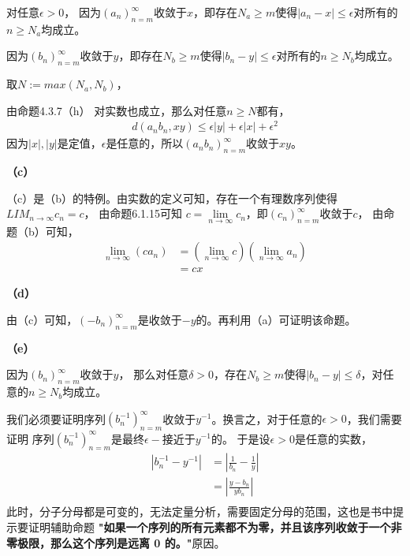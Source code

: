 \documentclass{article}
\theoremstyle{mystyle}
\begin{document}
对任意$\epsilon> 0$，
因为$(a_n)_{n=m}^\infty$收敛于$x$，即存在$N_a \geq m$使得$|a_n - x| \leq \epsilon$对所有的$n \geq N_a$均成立。

因为$(b_n)_{n=m}^\infty$收敛于$y$，即存在$N_b \geq m$使得$|b_n - y| \leq \epsilon$对所有的$n \geq N_b$均成立。

取$N := max(N_a, N_b)$，

由命题4.3.7（h） 对实数也成立，那么对任意$n \geq N$都有，
\begin{align*}
  d(a_nb_n,xy) \leq \epsilon|y| + \epsilon|x| + \epsilon^2
\end{align*}
因为$|x|, |y|$是定值，$\epsilon$是任意的，所以$(a_nb_n)_{n=m}^\infty$收敛于$xy$。

\textbf{（c）}

（c）是（b）的特例。由实数的定义可知，存在一个有理数序列使得$LIM_{n\rightarrow\infty}c_n = c$，
由命题6.1.15可知 $c = \lim\limits_{n \rightarrow \infty}c_n$，即$(c_n)_{n=m}^\infty$收敛于$c$，
由命题（b）可知，
\begin{align*}
  \lim\limits_{n\rightarrow \infty}(ca_n) & = (\lim\limits_{n\rightarrow \infty}c) (\lim\limits_{n\rightarrow \infty}a_n) \\
                                          & = cx
\end{align*}

\textbf{（d）}

由（c）可知，$(-b_n)_{n=m}^\infty$是收敛于$-y$的。再利用（a）可证明该命题。


\textbf{（e）}

因为$(b_n)_{n=m}^\infty$收敛于$y$，
那么对任意$\delta > 0$，存在$N_b \geq m$使得$|b_n - y| \leq \delta$，对任意的$n \geq N_b$均成立。

我们必须要证明序列$(b_n^{-1})_{n=m}^\infty$收敛于$y^{-1}$。换言之，对于任意的$\epsilon > 0$，我们需要证明
序列$(b_n^{-1})_{n=m}^\infty$是最终$\epsilon -$接近于$y^{-1}$的。
于是设$\epsilon > 0$是任意的实数，
\begin{align*}
  |b_n^{-1} - y^{-1}| & = \left| \frac{1}{b_n} - \frac{1}{y} \right| \\
                      & = \left| \frac{y - b_n}{yb_n} \right|        \\
\end{align*}
此时，分子分母都是可变的，无法定量分析，需要固定分母的范围，这也是书中提示要证明辅助命题
\textbf{"如果一个序列的所有元素都不为零，并且该序列收敛于一个非零极限，那么这个序列是远离 0 的。"}原因。
\end{document}
